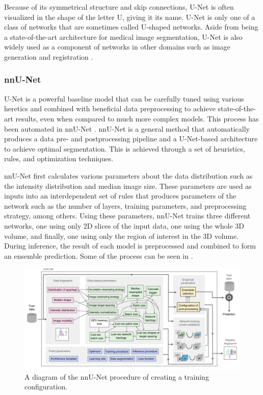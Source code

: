 Because of its symmetrical structure and skip connections, U-Net is often visualized in the shape of the letter U, giving it its name. U-Net is only one of a class of networks that are sometimes called U-shaped networks. Aside from being a state-of-the-art architecture for medical image segmentation, U-Net is also widely used as a component of networks in other domains such as image generation \cite{rombach2021highresolution} and registration \cite{sinclairAtlasISTNJointSegmentation2022a}.

\subsubsection{nnU-Net}

U-Net is a powerful baseline model that can be carefully tuned using various heretics and combined with beneficial data preprocessing to achieve state-of-the-art results, even when compared to much more complex models. This process has been automated in nnU-Net \cite{isenseeNnUNetSelfconfiguringMethod2021}. nnU-Net is a general method that automatically produces a data pre- and postprocessing pipeline and a U-Net-based architecture to achieve optimal segmentation. This is achieved through a set of heuristics, rules, and optimization techniques.

nnU-Net first calculates various parameters about the data distribution such as the intensity distribution and median image size. These parameters are used as inputs into an interdependent set of rules that produces parameters of the network such as the number of layers, training parameters, and preprocessing strategy, among others. Using these parameters, nnU-Net trains three different networks, one using only 2D slices of the input data, one using the whole 3D volume, and finally, one using only the region of interest in the 3D volume. During inference, the result of each model is preprocessed and combined to form an ensemble prediction. Some of the process can be seen in .

\begin{figure}[h!]
 \centering
 \includegraphics[width=\linewidth]{images/nnunet-arch}
 \caption{A diagram of the nnU-Net procedure of creating a training configuration. \cite{isenseeNnUNetSelfconfiguringMethod2021}}
 \label{fig:nnunet-arch}
 \end{figure}
 

